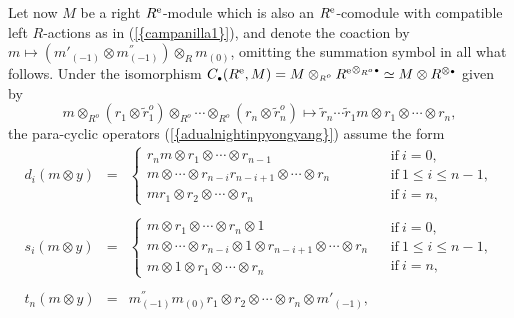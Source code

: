 \documentclass[reqno, a4paper, 10pt]{amsart}
\numberwithin{equation}{section}
\theoremstyle{plain}
\theoremstyle{definition}
\theoremstyle{remark}
\begin{document}
Let now $M$ be a right ${{R^{\rm e}}}$-module which is also an ${{R^{\rm e}}}$-comodule with compatible left $R$-actions as in {{\rm (}\ref{{campanilla1}}{\rm )}}, and denote the coaction by $m \mapsto (m'_{(-1)} \otimes m^{''}_{(-1)}) \otimes_{{\scriptscriptstyle{R}}} m_{(0)}$, omitting the summation symbol in all what follows.
Under the isomorphism 
$C_{{\scriptscriptstyle{\bullet}}}({{R^{\rm e}}}, M) = 
M \otimes_{{\scriptscriptstyle{{R^{o}}}}} {{R^{\rm e}}}^{\otimes_{{\scriptscriptstyle{{R^{o}}}}}
{{\scriptscriptstyle{\bullet}}}} 
\simeq M \otimes R^{\otimes {{\scriptscriptstyle{\bullet}}}}$ 
given by
\begin{equation}
\label{kababking}
m \otimes_{{\scriptscriptstyle{{R^{o}}}}} (r_1 \otimes \tilde{r}^o_1) \otimes_{{\scriptscriptstyle{{R^{o}}}}} \cdots \otimes_{{\scriptscriptstyle{{R^{o}}}}} (r_n \otimes {\tilde{{r}}}_n^o) 
{ \longmapsto  } 
{\tilde{{r}}}_n \cdots {\tilde{{r}}}_1 m \otimes r_1 \otimes \cdots \otimes r_n,   
\end{equation}
the para-cyclic operators 
{{\rm (}\ref{{adualnightinpyongyang}}{\rm )}} assume the form
\begin{equation}
\label{ceuta}
\!\!\!
\begin{array}{rcll}
d_i(m \otimes y)  &\!\!\!\!\! =& \!\!\!\!\!
\left\{ \!\!\!
\begin{array}{l}
r_n m \otimes r_1  \otimes   \cdots   \otimes   r_{n-1}
\\
m \otimes \cdots \otimes  r_{n-i} r_{n-i+1} \otimes  \cdots \otimes r_{n}
\\
m r_1 \otimes r_2  \otimes   \cdots    \otimes  
r_n 
\end{array}\right.  & \!\!\!\!\!\!\!\!   \begin{array}{l} \mbox{if} \ i \!=\! 0, \\ \mbox{if} \ 1
\!  \leq \! i \!\leq\! n-1, \\ \mbox{if} \ i \! = \! n, \end{array} \\
\
\\
s_i(m \otimes y) &\!\!\!\!\! =&\!\!\!\!\!  \left\{ \!\!\!
\begin{array}{l} m \otimes r_1 \otimes \cdots \otimes r_n \otimes 1
\\
m \otimes \cdots \otimes  r_{n-i} \otimes 1 \otimes r_{n-i+1} \otimes \cdots  \otimes r_{n}
\\
m \otimes 1 \otimes r_1 \otimes  \cdots \otimes  r_n 
\end{array}\right.   & \!\!\!\!\!\!\!  \begin{array}{l} 
\mbox{if} \ i\!=\!0, \\ 
\mbox{if} \ 1 \!\leq\! i \!\leq\! n-1, \\  \mbox{if} \ i\! = \!n, \end{array} \\
\
\\
t_n(m \otimes y) 
&\!\!\!\!\!=&\!\!\!\!\! 
m^{''}_{(-1)} m_{(0)} r_1 \otimes r_2 \otimes \cdots
\otimes r_n \otimes m'_{(-1)}, 
& \\
\end{array}
\end{equation}
\end{document}
